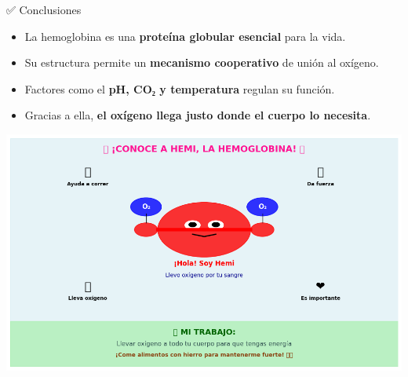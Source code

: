 \documentclass[
  ignorenonframetext,
]{beamer}
\providecommand{\tightlist}{%
  \setlength{\itemsep}{0pt}\setlength{\parskip}{0pt}}
\begin{document}
\begin{frame}{✅ Conclusiones}
\label{conclusiones}
\begin{itemize}
\tightlist
\item
  La hemoglobina es una \textbf{proteína globular esencial} para la
  vida.\\
\item
  Su estructura permite un \textbf{mecanismo cooperativo} de unión al
  oxígeno.\\
\item
  Factores como el \textbf{pH, CO₂ y temperatura} regulan su función.\\
\item
  Gracias a ella, \textbf{el oxígeno llega justo donde el cuerpo lo
  necesita}.
\end{itemize}

\begin{center}
\includegraphics[width=0.55\linewidth,height=\textheight,keepaspectratio]{conclusion.png}
\end{center}
\end{frame}
\end{document}
